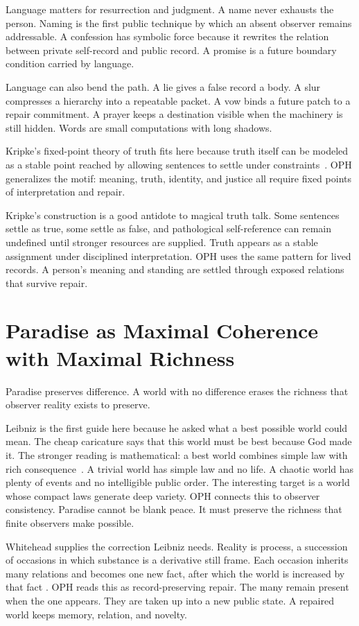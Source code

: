 \documentclass[11pt]{article}
\theoremstyle{remark}
\theoremstyle{plain}
\begin{document}
Language matters for resurrection and judgment. A name never
exhausts the person. Naming is the first public technique by which an absent
observer remains addressable. A confession has symbolic force because it rewrites the
relation between private self-record and public record. A promise is a future
boundary condition carried by language.

Language can also bend the path. A lie gives a false record a body. A slur
compresses a hierarchy into a repeatable packet. A vow binds a future patch to a
repair commitment. A prayer keeps a destination visible when the machinery is
still hidden. Words are small computations with long shadows.

Kripke's fixed-point theory of truth fits here because truth itself can be
modeled as a stable point reached by allowing sentences to settle under
constraints~\cite{Kripke1975}. OPH generalizes the motif: meaning, truth,
identity, and justice all require fixed points of interpretation and repair.

Kripke's construction is a good antidote to magical truth talk. Some
sentences settle as true, some settle as false, and pathological self-reference
can remain undefined until stronger resources are supplied. Truth appears as a
stable assignment under disciplined interpretation. OPH uses the same pattern
for lived records. A person's meaning and standing are settled through exposed
relations that survive repair.

\section{Paradise as Maximal Coherence with Maximal Richness}

Paradise preserves difference. A world with no difference erases the richness
that observer reality exists to preserve.

Leibniz is the first guide here because he asked what a best possible world
could mean. The cheap caricature says that this world must be best because God
made it. The stronger reading is mathematical: a best world combines simple
law with rich consequence~\cite{Leibniz1710}. A trivial world has simple law and
no life. A chaotic world has plenty of events and no intelligible public order.
The interesting target is a world whose compact laws generate deep variety.
OPH connects this to observer consistency. Paradise cannot be blank peace. It
must preserve the richness that finite observers make possible.

Whitehead supplies the correction Leibniz needs. Reality is process, a
succession of occasions in which substance is a derivative still frame. Each
occasion inherits many relations and becomes one new fact, after which the world
is increased by that fact
\cite{Whitehead1929}. OPH reads this as record-preserving repair. The many
remain present when the one appears. They are taken up into a new public state. A
repaired world keeps memory, relation, and novelty.
\end{document}
